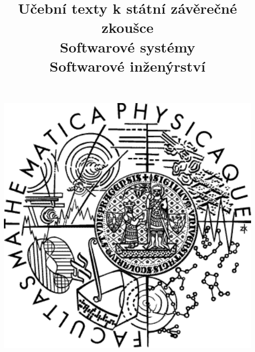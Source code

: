 \clearpage

\clearpage

\title{\LARGE Učební texty k státní závěrečné zkoušce \\ Softwarové systémy \\ Softwarové inženýrství}




\maketitle

\vspace{10mm}
\begin{center}
\includegraphics[scale=0.5]{../common/logo.pdf}
\end{center} 

\clearpage

\clearpage

\tableofcontents





